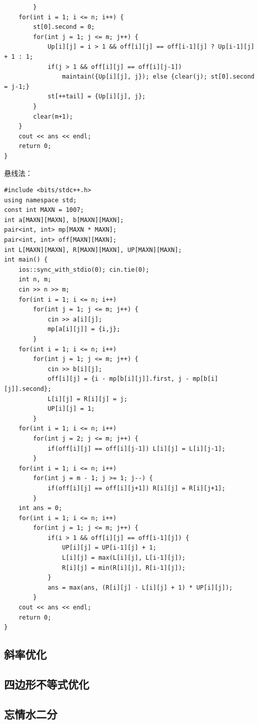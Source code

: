 \documentclass[10pt]{ctexart}
\begin{document}
{\begin{lstlisting}
        }
    for(int i = 1; i <= n; i++) {
        st[0].second = 0;
        for(int j = 1; j <= m; j++) {
            Up[i][j] = i > 1 && off[i][j] == off[i-1][j] ? Up[i-1][j] + 1 : 1;
            if(j > 1 && off[i][j] == off[i][j-1]) 
                maintain({Up[i][j], j}); else {clear(j); st[0].second = j-1;}
            st[++tail] = {Up[i][j], j};
        }
        clear(m+1);
    }
    cout << ans << endl;
    return 0;
}
\end{lstlisting}
悬线法：
\begin{lstlisting}
#include <bits/stdc++.h>
using namespace std;
const int MAXN = 1007;
int a[MAXN][MAXN], b[MAXN][MAXN];
pair<int, int> mp[MAXN * MAXN];
pair<int, int> off[MAXN][MAXN];
int L[MAXN][MAXN], R[MAXN][MAXN], UP[MAXN][MAXN];
int main() {
    ios::sync_with_stdio(0); cin.tie(0);
    int n, m;
    cin >> n >> m;
    for(int i = 1; i <= n; i++)
        for(int j = 1; j <= m; j++) {
            cin >> a[i][j];
            mp[a[i][j]] = {i,j};
        }
    for(int i = 1; i <= n; i++)
        for(int j = 1; j <= m; j++) {
            cin >> b[i][j];
            off[i][j] = {i - mp[b[i][j]].first, j - mp[b[i][j]].second};
            L[i][j] = R[i][j] = j;
            UP[i][j] = 1;
        }
    for(int i = 1; i <= n; i++) 
        for(int j = 2; j <= m; j++) {
            if(off[i][j] == off[i][j-1]) L[i][j] = L[i][j-1];
        }
    for(int i = 1; i <= n; i++) 
        for(int j = m - 1; j >= 1; j--) {
            if(off[i][j] == off[i][j+1]) R[i][j] = R[i][j+1];
        }
    int ans = 0;
    for(int i = 1; i <= n; i++) 
        for(int j = 1; j <= m; j++) {
            if(i > 1 && off[i][j] == off[i-1][j]) {
                UP[i][j] = UP[i-1][j] + 1;
                L[i][j] = max(L[i][j], L[i-1][j]);
                R[i][j] = min(R[i][j], R[i-1][j]); 
            }
            ans = max(ans, (R[i][j] - L[i][j] + 1) * UP[i][j]);
        }
    cout << ans << endl;
    return 0;
}
\end{lstlisting}
\subsection{斜率优化}
\subsection{四边形不等式优化}
\subsection{忘情水二分}

}
\end{document}

